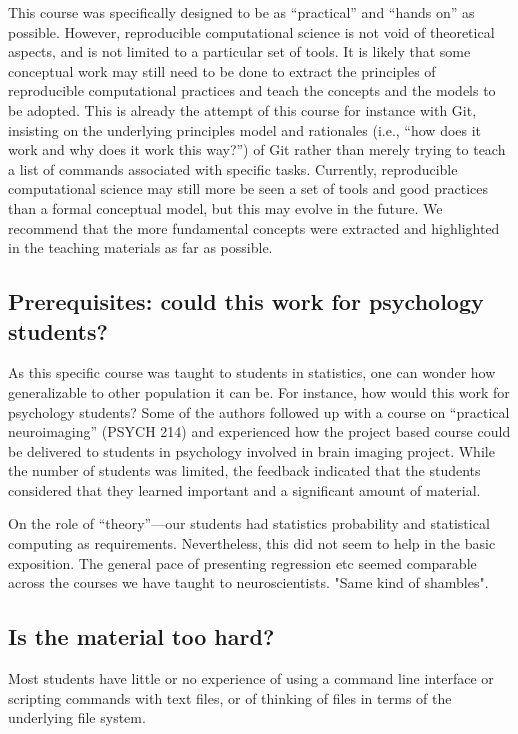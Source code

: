 This course was specifically designed to be as ``practical'' and ``hands on''
as possible.
However, reproducible computational science is not void of theoretical aspects,
and is not limited to a particular set of tools.
It is likely that some conceptual work may still need to be done to extract the
principles of reproducible computational practices and teach the concepts and
the models to be adopted.
This is already the attempt of this course for instance with Git, insisting on
the underlying principles model and rationales (i.e., ``how does it work and
why does it work this way?'') of Git rather than merely trying to teach a list
of commands associated with specific tasks. 
Currently, reproducible computational science may still more be seen a set of
tools and good practices than a formal conceptual model, but this may evolve in
the future.
We recommend that the more fundamental concepts were extracted and highlighted
in the teaching materials as far as possible.

\subsection{Prerequisites: could this work for psychology students?}

As this specific course was taught to students in statistics, one can wonder
how generalizable to other population it can be.
For instance, how would this work for psychology students?
Some of the authors followed up with a course on ``practical neuroimaging''
(PSYCH 214) and experienced how the project based course could be delivered to
students in psychology involved in brain imaging project.
While the number of students was limited, the feedback indicated that the
students considered that they learned important and a significant amount of
material.

On the role of ``theory''---our students had statistics probability and
statistical computing as requirements.
Nevertheless, this did not seem to help in the basic exposition. 
The general pace of presenting regression etc seemed comparable across the
courses we have taught to neuroscientists.
"Same kind of shambles".

\subsection{Is the material too hard?}

Most students have little or no experience of using a command line interface
or scripting commands with text files, or of thinking of files in terms of the
underlying file system.

